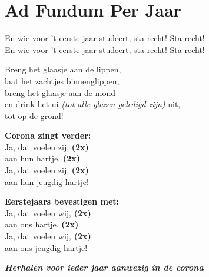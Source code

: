 \section{Ad Fundum Per Jaar}
En wie voor 't eerste jaar studeert, sta recht! Sta recht!\\
En wie voor 't eerste jaar studeert, sta recht! Sta recht!

Breng het glaasje aan de lippen,\\
laat het zachtjes binnenglippen,\\
breng het glaasje aan de mond\\
en drink het ui-\textit{(tot alle glazen geledigd zijn)}-uit,\\
tot op de grond!

\textbf{Corona zingt verder:}\\
Ja, dat voelen zij, \textbf{(2x)}\\
aan hun hartje. \textbf{(2x)}\\
Ja, dat voelen zij, \textbf{(2x)}\\
aan hun jeugdig hartje!

\textbf{Eerstejaars bevestigen met:}\\
Ja, dat voelen wij, \textbf{(2x)}\\
aan ons hartje. \textbf{(2x)}\\
Ja, dat voelen wij, \textbf{(2x)}\\
aan ons jeugdig hartje!

\textbf{\textit{Herhalen voor ieder jaar aanwezig in de corona}}